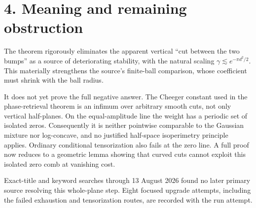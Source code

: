 \documentclass[11pt]{article}
\begin{document}
\section*{4. Meaning and remaining obstruction}

The theorem rigorously eliminates the apparent vertical ``cut between the
two bumps'' as a source of deteriorating stability, with the natural scaling
$\gamma\lesssim e^{-\pi d^2/2}$.  This materially strengthens the source's
finite-ball comparison, whose coefficient must shrink with the ball radius.

It does not yet prove the full negative answer.  The Cheeger constant used in
the phase-retrieval theorem is an infimum over arbitrary smooth cuts, not only
vertical half-planes.  On the equal-amplitude line the weight has a periodic
set of isolated zeros.  Consequently it is neither pointwise comparable to
the Gaussian mixture nor log-concave, and no justified half-space
isoperimetry principle applies.  Ordinary conditional tensorization also
fails at the zero line.  A full proof now reduces to a geometric lemma showing
that curved cuts cannot exploit this isolated zero comb at vanishing cost.

Exact-title and keyword searches through 13 August 2026 found no later primary
source resolving this whole-plane step.  Eight focused upgrade attempts,
including the failed exhaustion and tensorization routes, are recorded with
the run attempt.
\end{document}
